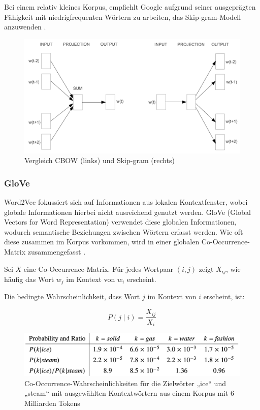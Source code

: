 Bei einem relativ kleines Korpus, empfiehlt Google aufgrund seiner ausgeprägten Fähigkeit mit niedrigfrequenten Wörtern zu arbeiten, 
das Skip-gram-Modell anzuwenden \cite{schumacher2024word2vec}.

\begin{figure}[htbp]
    \begin{center}
        \includegraphics[scale=0.6]{static/cbow_skipgram.png}
        \caption{\label{fig:cbow_skipgram} Vergleich CBOW (links) und Skip-gram (rechts) \cite{mikolov2013}}
    \end{center}
\end{figure}

\subsubsection{GloVe}

Word2Vec fokussiert sich auf Informationen aus lokalen Kontextfenster, wobei globale Informationen hierbei nicht ausreichend genutzt werden.
GloVe (Global Vectors for Word Representation) verwendet diese globalen Informationen, wodurch semantische Beziehungen zwischen Wörtern erfasst werden.
Wie oft diese zusammen im Korpus vorkommen, wird in einer globalen Co-Occurrence-Matrix zusammengefasst \cite{Wang:2020aa}.

Sei $X$ eine Co-Occurrence-Matrix.
Für jedes Wortpaar $(i, j)$ zeigt $X_{ij}$, wie häufig das Wort $w_j$ im Kontext von $w_i$ erscheint.

Die bedingte Wahrscheinlichkeit, dass Wort $j$ im Kontext von $i$ erscheint, ist:

\begin{equation}
    P(j \mid i) = \frac{X_{ij}}{X_i}
\end{equation}

\begin{figure}[htbp]
    \begin{center}
        \includegraphics[scale=0.3]{static/glove_matrix.png}
        \caption{\label{fig:glove_matrix} Co-Occurrence-Wahrscheinlichkeiten für die Zielwörter „ice“ und „steam“ mit ausgewählten Kontextwörtern aus einem Korpus mit 6 Milliarden Tokens \cite{pennington2014glove}}
    \end{center}
\end{figure}

